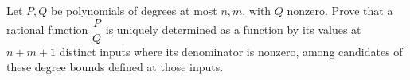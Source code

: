 Let $ P,Q $ be polynomials of degrees at most $ n,m $, with $ Q $ nonzero. Prove that a rational function $ \dfrac{P}{Q} $ is uniquely determined as a function by its values at $ n+m+1 $ distinct inputs where its denominator is nonzero, among candidates of these degree bounds defined at those inputs.
